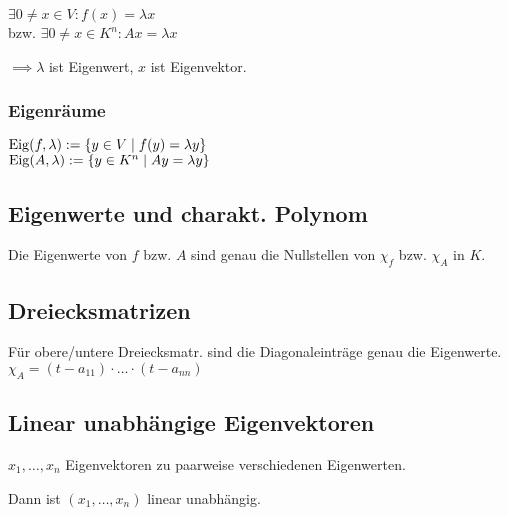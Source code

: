 $\exists 0\neq x\in V: f(x)=\lambda x$ \\
bzw. $\exists 0\neq x\in K^n: Ax = \lambda x$

$\implies \lambda$ ist Eigenwert, $x$ ist Eigenvektor.

\subsubsection*{Eigenräume}
$\operatorname{Eig}(f,\lambda) := \{y\in V \mid f(y)=\lambda y\}$ \\
$\operatorname{Eig}(A,\lambda) := \{y\in K^n \mid Ay=\lambda y\}$

\subsection*{Eigenwerte und charakt. Polynom}
Die Eigenwerte von $f$ bzw. $A$ sind genau die Nullstellen von $\chi_f$ bzw. $\chi_A$ in $K$.

\subsection*{Dreiecksmatrizen}
Für obere/untere Dreiecksmatr. sind die Diagonaleinträge genau die Eigenwerte.
$\chi_A=(t-a_{11})\cdot\dots\cdot(t-a_{nn})$

\subsection*{Linear unabhängige Eigenvektoren}
$x_1,\dots,x_n$ Eigenvektoren zu paarweise verschiedenen Eigenwerten.

Dann ist $(x_1,\dots,x_n)$ linear unabhängig.
